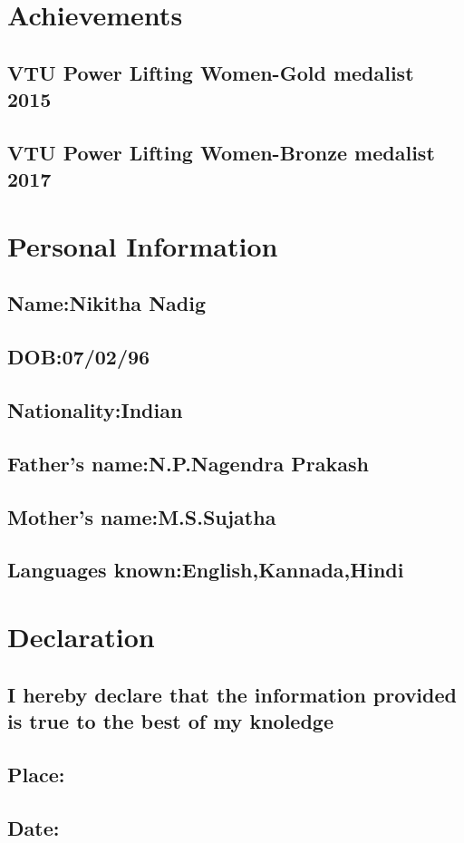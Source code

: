 \documentclass{article}
\begin{document}
\section{Achievements}
\subsection{VTU Power Lifting Women-Gold medalist 2015}
\subsection{VTU Power Lifting Women-Bronze medalist 2017}
\section{Personal Information}
\subsection{Name:Nikitha Nadig}
\subsection{DOB:07/02/96}
\subsection{Nationality:Indian}
\subsection{Father's name:N.P.Nagendra Prakash}
\subsection{Mother's name:M.S.Sujatha}
\subsection{Languages known:English,Kannada,Hindi}
\section{Declaration}
\subsection{I hereby declare that the information provided is true to the best of my knoledge}
\subsection{Place:}
\subsection{Date:}
\end{document}
